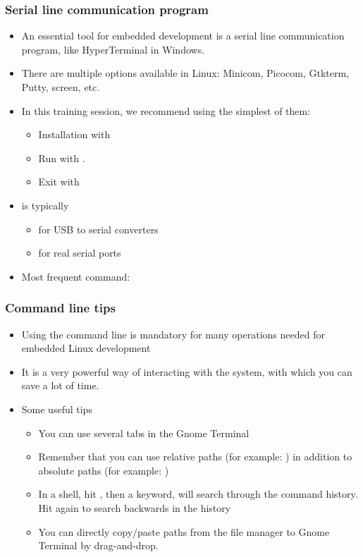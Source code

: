 \begin{frame}
  \frametitle{Serial line communication program}
  \begin{itemize}
  \item An essential tool for embedded development is a serial line
    communication program, like HyperTerminal in Windows.
  \item There are multiple options available in Linux: Minicom,
    Picocom, Gtkterm, Putty, screen, etc.
  \item In this training session, we recommend using the simplest of
    them: 
    \begin{itemize}
    \item Installation with 
    \item Run with .
    \item Exit with \code{[Ctrl][a] [Ctrl][x]}
    \end{itemize}
  \item {} is typically
    \begin{itemize}
    \item {} for USB to serial converters
    \item {} for real serial ports
    \end{itemize}
  \item Most frequent command: 
  \end{itemize}
\end{frame}

\begin{frame}
  \frametitle{Command line tips}
  \begin{itemize}
  \item Using the command line is mandatory for many operations needed
    for embedded Linux development
  \item It is a very powerful way of interacting with the system, with
    which you can save a lot of time.
  \item Some useful tips
    \begin{itemize}
    \item You can use several tabs in the Gnome Terminal
    \item Remember that you can use relative paths (for example:
      ) in addition to absolute paths (for example:
      )
    \item In a shell, hit \code{[Control] [r]}, then a keyword, will
      search through the command history. Hit \code{[Control] [r]}
      again to search backwards in the history
    \item You can directly copy/paste paths from the file manager to
      Gnome Terminal by drag-and-drop.
    \end{itemize}
  \end{itemize}
\end{frame}
